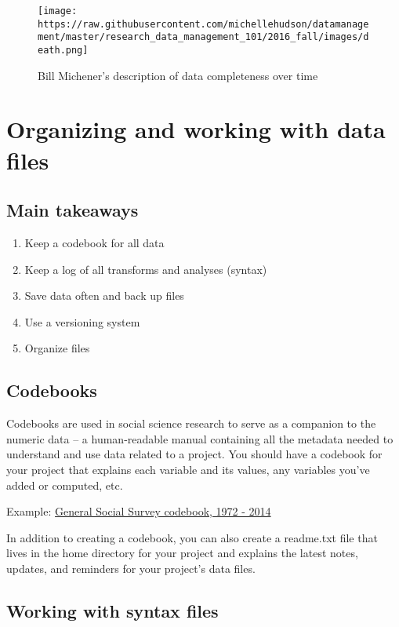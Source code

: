 \begin{figure}[htbp]
\centering
\texttt{[image: https://raw.githubusercontent.com/michellehudson/datamanagement/master/research\_data\_management\_101/2016\_fall/images/death.png]}
\caption{Bill Michener's description of data completeness over time}
\end{figure}

\section{Organizing and working with data
files}\label{organizing-and-working-with-data-files}

\subsection{Main takeaways}\label{main-takeaways}

\begin{enumerate}
\def\labelenumi{\arabic{enumi}.}
\tightlist
\item
  Keep a codebook for all data
\item
  Keep a log of all transforms and analyses (syntax)
\item
  Save data often and back up files
\item
  Use a versioning system
\item
  Organize files
\end{enumerate}

\subsection{Codebooks}\label{codebooks}

Codebooks are used in social science research to serve as a companion to
the numeric data -- a human-readable manual containing all the metadata
needed to understand and use data related to a project. You should have
a codebook for your project that explains each variable and its values,
any variables you've added or computed, etc.

Example: \href{http://gss.norc.org/Get-Documentation}{General Social
Survey codebook, 1972 - 2014}

In addition to creating a codebook, you can also create a readme.txt
file that lives in the home directory for your project and explains the
latest notes, updates, and reminders for your project's data files.

\subsection{Working with syntax files}\label{working-with-syntax-files}


